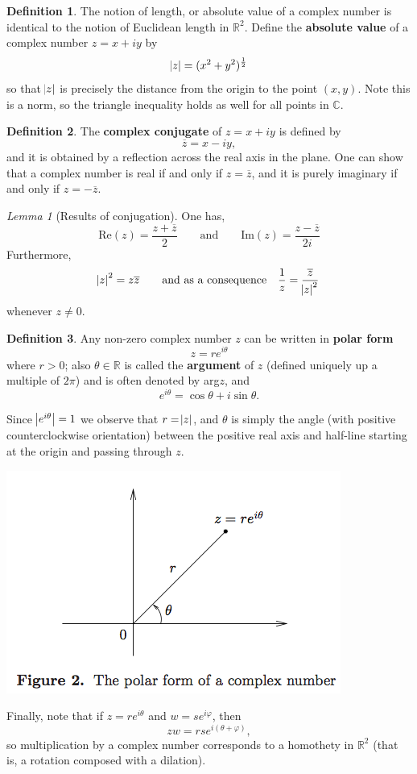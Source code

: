 \documentclass{article}
\theoremstyle{definition}
\newtheorem{definition}{Definition}[section]
\theoremstyle{remark}
\newtheorem{lemma}[theorem]{Lemma}
\begin{document}
    \begin{definition}
        The notion of length, or absolute value of a complex number is identical to the notion of Euclidean length in $\mathbb{R}^2$.
        Define the \textbf{absolute value} of a complex number $z = x + iy$ by 
        \[ \abs{z} = (x^2 + y^2)^{\frac{1}{2}} \]
        so that $\abs{z}$ is precisely the distance from the origin to the point $(x,y)$. Note this is a norm, so the triangle
        inequality holds as well for all points in $\mathbb{C}$.
    \end{definition}
    \begin{definition}
        The \textbf{complex conjugate} of $z=x+iy$ is defined by
        \[ \overline{z} = x - iy,\]
        and it is obtained by a reflection across the real axis in the plane. One can show that a complex number is real if and only
        if $z = \overline{z}$, and it is purely imaginary if and only if $z = -\overline{z}$.
    \end{definition}
    \begin{lemma}[Results of conjugation]
        One has,
        \[ \text{Re}(z) = \frac{z + \overline{z}}{2}\qquad\text{and}\qquad \text{Im}(z) = \frac{z - \overline{z}}{2i} \]
        Furthermore,
        \[ \abs{z}^2 = z\overline{z}\qquad\text{and as a consequence}\quad \frac{1}{z} = \frac{\overline{z}}{\abs{z}^2} \]
        whenever $z\neq 0$.
    \end{lemma}
    \begin{definition}
        Any non-zero complex number $z$ can be written in \textbf{polar form}
        \[ z = re^{i\theta} \]
        where $r>0$; also $\theta\in\mathbb{R}$ is called the \textbf{argument} of $z$ (defined uniquely up a multiple of $2\pi$)
        and is often denoted by arg$z$, and
        \[ e^{i\theta} = \cos{\theta}+i\sin{\theta}.\]
    \end{definition}
    Since $\abs{e^{i\theta}}=1$ we observe that $r=\abs{z}$, and $\theta$ is simply the angle (with positive counterclockwise
    orientation) between the positive real axis and half-line starting at the origin and passing through $z$.

    \begin{center}
        \includegraphics[scale=0.5]{fig2.png}
    \end{center}
    Finally, note that if $z=re^{i\theta}$ and $w=se^{i\varphi}$, then
    \[ zw = rse^{i(\theta+\varphi)}, \]
    so multiplication by a complex number corresponds to a homothety in $\mathbb{R}^2$ (that is, a rotation composed with a dilation).
    
\end{document}
